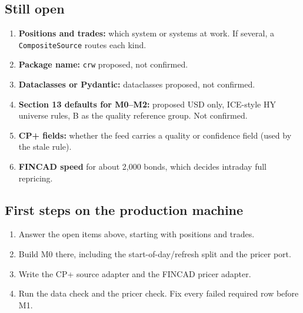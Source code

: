\documentclass[11pt,a4paper]{article}
\newcommand{\code}[1]{\texttt{\small #1}}
\begin{document}
\subsection{Still open}
\begin{enumerate}
\item \textbf{Positions and trades:} which system or systems at work. If several, a \code{CompositeSource} routes each kind.
\item \textbf{Package name:} \code{crw} proposed, not confirmed.
\item \textbf{Dataclasses or Pydantic:} dataclasses proposed, not confirmed.
\item \textbf{Section 13 defaults for M0--M2:} proposed USD only, ICE-style HY universe rules, B as the quality reference group. Not confirmed.
\item \textbf{CP+ fields:} whether the feed carries a quality or confidence field (used by the stale rule).
\item \textbf{FINCAD speed} for about 2,000 bonds, which decides intraday full repricing.
\end{enumerate}

\subsection{First steps on the production machine}
\begin{enumerate}
\item Answer the open items above, starting with positions and trades.
\item Build M0 there, including the start-of-day/refresh split and the pricer port.
\item Write the CP+ source adapter and the FINCAD pricer adapter.
\item Run the data check and the pricer check. Fix every failed required row before M1.
\end{enumerate}
\end{document}
